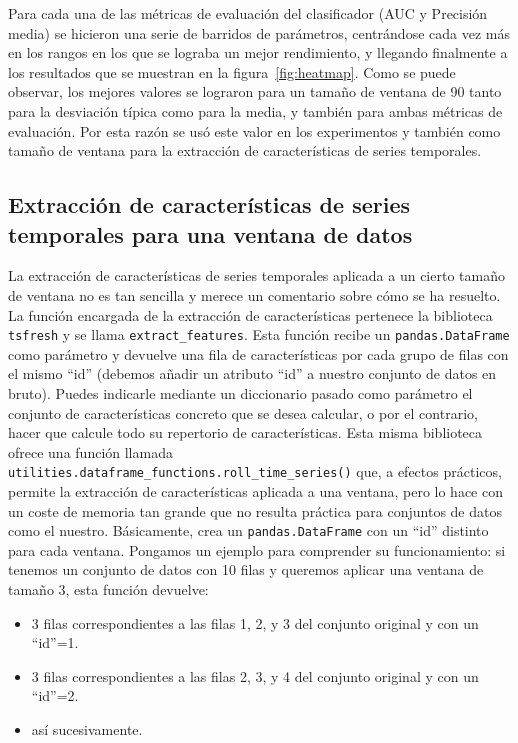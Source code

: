 Para cada una de las métricas de evaluación del clasificador (AUC y Precisión media) se hicieron una serie de barridos de parámetros, centrándose cada vez más en los rangos en los que se lograba un mejor rendimiento, y llegando finalmente a los resultados que se muestran en la figura~\ref{fig:heatmap}. Como se puede observar, los mejores valores se lograron para un tamaño de ventana de 90 tanto para la desviación típica como para la media, y también para ambas métricas de evaluación. Por esta razón se usó este valor en los experimentos y también como tamaño de ventana para la extracción de características de series temporales. 

\subsection{Extracción de características de series temporales para una ventana de datos}

La extracción de características de series temporales aplicada a un cierto tamaño de ventana no es tan sencilla y merece un comentario sobre cómo se ha resuelto. La función encargada de la extracción de características pertenece la biblioteca \texttt{tsfresh} y se llama \texttt{extract\_features}. Esta función recibe un \texttt{pandas.DataFrame} como parámetro y devuelve una fila de características por cada grupo de filas con el mismo ``id'' (debemos añadir un atributo ``id'' a nuestro conjunto de datos en bruto). Puedes indicarle mediante un diccionario pasado como parámetro el conjunto de características concreto que se desea calcular, o por el contrario, hacer que calcule todo su repertorio de características. Esta misma biblioteca ofrece una función llamada \texttt{utilities.dataframe\_functions.roll\_time\_series()} que, a efectos prácticos, permite la extracción de características aplicada a una ventana, pero lo hace con un coste de memoria tan grande que no resulta práctica para conjuntos de datos como el nuestro. Básicamente, crea un \texttt{pandas.DataFrame} con un ``id'' distinto para cada ventana. Pongamos un ejemplo para comprender su funcionamiento: si tenemos un conjunto de datos con 10 filas y queremos aplicar una ventana de tamaño 3, esta función devuelve: 
\begin{itemize}
	\item 3 filas correspondientes a las filas 1, 2, y 3 del conjunto original y con un ``id''=1. 
	\item 3 filas correspondientes a las filas 2, 3, y 4 del conjunto original y con un ``id''=2. 
	\item así sucesivamente. 
\end{itemize}

